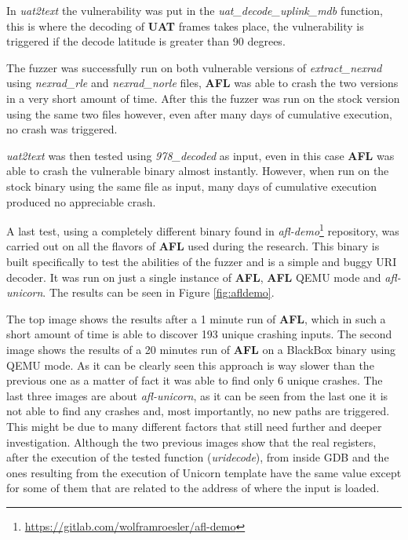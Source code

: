 \documentclass[../main.tex]{subfiles}
\begin{document}
In \textit{uat2text} the vulnerability was put in the
\textit{uat\_decode\_uplink\_mdb} function, this is where the decoding of
\textbf{UAT} frames takes place, the vulnerability is triggered if the decode
latitude is greater than 90 degrees.

The fuzzer was successfully run on both vulnerable versions of
\textit{extract\_nexrad} using \textit{nexrad\_rle} and \textit{nexrad\_norle}
files, \textbf{AFL} was able to crash the two versions in a very short amount of
time. After this the fuzzer was run on the stock version using the same two
files however, even after many days of cumulative execution, no crash was
triggered.

\textit{uat2text} was then tested using \textit{978\_decoded} as input, even in
this case \textbf{AFL} was able to crash the vulnerable binary almost instantly.
However, when run on the stock binary using the same file as input, many days of
cumulative execution produced no appreciable crash.

A last test, using a completely different binary found in
\textit{afl-demo}\footnote{\url{https://gitlab.com/wolframroesler/afl-demo}}
repository, was carried out on all the flavors of \textbf{AFL} used during the
research. This binary is built specifically to test the abilities of the fuzzer
and is a simple and buggy URI decoder. It was run on just a single instance of
\textbf{AFL}, \textbf{AFL} QEMU mode and \textit{afl-unicorn}. The results can
be seen in Figure \ref{fig:afldemo}.

The top image shows the results after a 1 minute run of \textbf{AFL}, which
in such a short amount of time is able to discover 193 unique crashing inputs.
The second image shows the results of a 20 minutes run of \textbf{AFL} on a
BlackBox binary using QEMU mode. As it can be clearly seen this approach is way
slower than the previous one as a matter of fact it was able to find only 6
unique crashes. The last three images are about \textit{afl-unicorn}, as it can
be seen from the last one it is not able to find any crashes and, most
importantly, no new paths are triggered. This might be due to many different
factors that still need further and deeper investigation. Although the two
previous images show that the real registers, after the execution of the tested
function (\textit{uridecode}), from inside GDB and the ones resulting from the
execution of Unicorn template have the same value except for some of them that
are related to the address of where the input is loaded.
\end{document}
